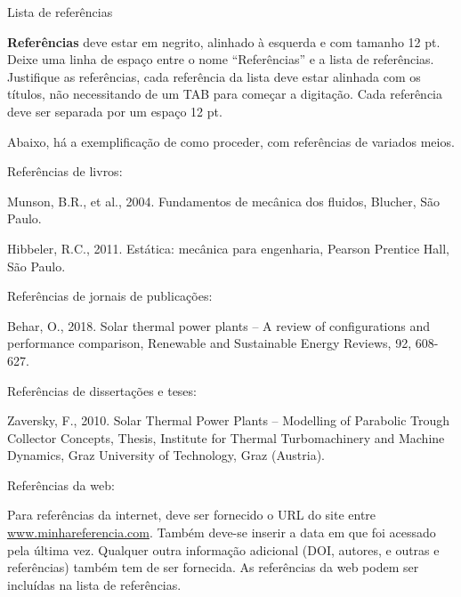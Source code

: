 \documentclass[12pt, a4paper]{article}
\begin{document}
\noindent
Lista de referências
\vspace{0.5cm}

\textbf{Referências} deve estar em negrito, alinhado à esquerda e com tamanho 12 pt. Deixe uma linha de espaço entre o nome “Referências” e a lista de referências. Justifique as referências, cada referência da lista deve estar alinhada com os títulos, não necessitando de um TAB para começar a digitação. Cada referência deve ser separada por um espaço 12 pt.

Abaixo, há a exemplificação de como proceder, com referências de variados meios.

\noindent
Referências de livros:
\vspace{0.5cm}

\noindent
Munson, B.R., et al., 2004. Fundamentos de mecânica dos fluidos, Blucher, São Paulo.
\vspace{0.5cm}

\noindent
Hibbeler, R.C., 2011. Estática: mecânica para engenharia, Pearson Prentice Hall, São Paulo.
\vspace{0.5cm}

\noindent
Referências de jornais de publicações:
\vspace{0.5cm}

\noindent
Behar, O., 2018. Solar thermal power plants – A review of configurations and performance comparison, Renewable and Sustainable Energy Reviews, 92, 608-627.
\vspace{0.5cm}

\noindent
Referências de dissertações e teses:
\vspace{0.5cm}

\noindent
Zaversky, F., 2010. Solar Thermal Power Plants – Modelling of Parabolic Trough Collector Concepts, Thesis, Institute for Thermal Turbomachinery and Machine Dynamics, Graz University of Technology, Graz (Austria).
\vspace{0.5cm}

\noindent
Referências da web:
\vspace{0.5cm}

\noindent
Para referências da internet, deve ser fornecido o URL do site entre \url{www.minhareferencia.com}. Também deve-se inserir a data em que foi acessado pela última vez. Qualquer outra informação adicional (DOI, autores, e outras e referências) também tem de ser fornecida. As referências da web podem ser incluídas na lista de referências.
\vspace{-2cm}
%    
%  
\end{document}
